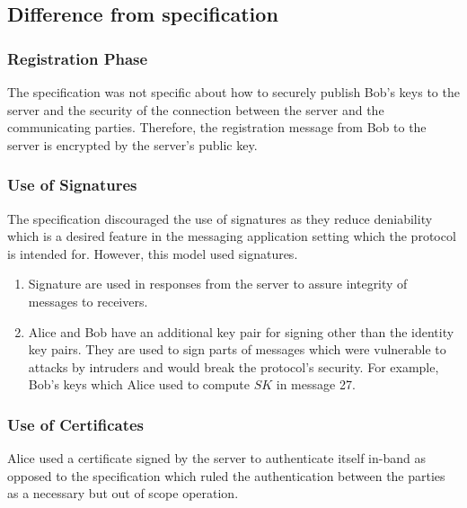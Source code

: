 \subsection{Difference from specification}
\subsubsection{Registration Phase}
The specification was not specific about how to securely publish Bob's keys to the server and the security of the connection between the server and the communicating parties. Therefore, the registration message from Bob to the server is encrypted by the server's public key.
\subsubsection{Use of Signatures}
The specification discouraged the use of signatures as they reduce deniability which is a desired feature in the messaging application setting which the protocol is intended for. However, this model used signatures.
\begin{enumerate}
	\item Signature are used in responses from the server to assure integrity of messages to receivers.
	\item Alice and Bob have an additional key pair for signing other than the identity key pairs. They are used to sign parts of messages which were vulnerable to attacks by intruders and would break the protocol's security. For example, Bob's keys which Alice used to compute $ SK $ in message 27.
\end{enumerate}
\subsubsection{Use of Certificates}
Alice used a certificate signed by the server to authenticate itself in-band as opposed to the specification which ruled the authentication between the parties as a necessary but out of scope operation.